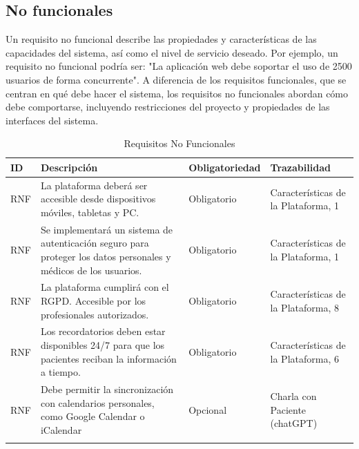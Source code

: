 \documentclass{article}
\begin{document}
\subsection{No funcionales}

Un requisito no funcional describe las propiedades y características de las capacidades del sistema, así como el nivel de servicio deseado. Por ejemplo, un requisito no funcional podría ser: "La aplicación web debe soportar el uso de 2500 usuarios de forma concurrente". A diferencia de los requisitos funcionales, que se centran en qué debe hacer el sistema, los requisitos no funcionales abordan cómo debe comportarse, incluyendo restricciones del proyecto y propiedades de las interfaces del sistema.

\begin{table}[H]
	\centering
	\caption{Requisitos No Funcionales}
	\begin{tabular}{@{} p{2.5cm} p{6.5cm} p{3cm} p{3cm} @{}}
		\toprule
		\textbf{ID} & \textbf{Descripción} & \textbf{Obligatoriedad} & \textbf{Trazabilidad} \\
		\midrule
		\addlinespace
		\stepcounter{requisitosNoFuncionales} RNF\therequisitosNoFuncionales & La plataforma deberá ser accesible desde dispositivos móviles, tabletas y PC. & Obligatorio & Características de la Plataforma, 1 \\
		\addlinespace
		\stepcounter{requisitosNoFuncionales} RNF\therequisitosNoFuncionales & Se implementará un sistema de autenticación seguro para proteger los datos personales y médicos de los usuarios. & Obligatorio & Características de la Plataforma, 1 \\
		\addlinespace
		\stepcounter{requisitosNoFuncionales} RNF\therequisitosNoFuncionales &La plataforma cumplirá con el RGPD. Accesible por los profesionales autorizados. & Obligatorio & Características de la Plataforma, 8 \\
		\addlinespace
		\stepcounter{requisitosNoFuncionales}
		RNF\therequisitosNoFuncionales & Los recordatorios deben estar disponibles 24/7 para que los pacientes reciban la información a tiempo. & Obligatorio & Características de la Plataforma, 6 \\
		\addlinespace
		\stepcounter{requisitosNoFuncionales}
		RNF\therequisitosNoFuncionales &  Debe permitir la sincronización con calendarios personales, como Google Calendar o iCalendar & Opcional & Charla con Paciente (chatGPT) \\
		\addlinespace
		
		\bottomrule
	\end{tabular}
\end{table}
\end{document}
